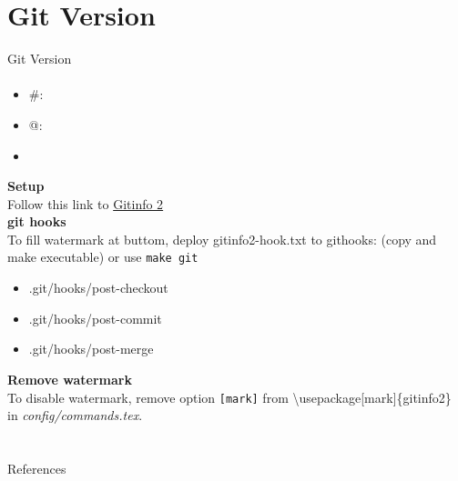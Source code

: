 \documentclass[10pt,aspectratio=169,
compress
]{beamer}
\begin{document}
\section{Git Version}
\begin{frame}{Git Version}\framesubtitle{\gitAbbrevHash}
\begin{itemize}
\item \#: \gitAbbrevHash
\item @: \gitAuthorIsoDate
\item \gitReferences
\end{itemize}
\textbf{Setup}\\
Follow this link to \href{https://www.ctan.org/tex-archive/macros/latex/contrib/gitinfo2}{Gitinfo 2}\\
\textbf{git hooks}\\
  To fill watermark at buttom, deploy gitinfo2-hook.txt to githooks: (copy and make executable) or use \texttt{make git}
  \begin{itemize}
      \item .git/hooks/post-checkout
      \item .git/hooks/post-commit
      \item .git/hooks/post-merge
  \end{itemize}
  \textbf{Remove watermark}\\
  To disable watermark, remove option \texttt{[mark]} from \textbackslash usepackage[mark]\{gitinfo2\} in \textit{config/commands.tex}.

\end{frame}


\section*{}
\begin{frame}[allowframebreaks]{References}
\def\newblock{\hskip .11em plus .33em minus .07em}
\scriptsize


\normalsize
\end{frame}




\end{document}
